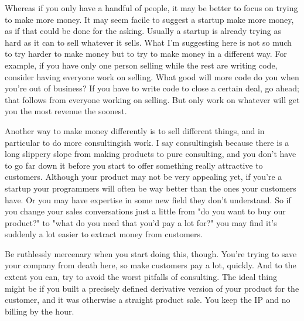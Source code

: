 Whereas
                  if you only have a handful of people, it may be better to
                  focus on trying to make more money. It may seem facile to
                  suggest a startup make more money, as if that could be done
                  for the asking. Usually a startup is already trying as hard as
                  it can to sell whatever it sells. What I'm suggesting here is
                  not so much to try harder to make money but to try to make
                  money in a different way. For example, if you have only one
                  person selling while the rest are writing code, consider
                  having everyone work on selling. What good will more code do
                  you when you're out of business? If you have to write code to
                  close a certain deal, go ahead; that follows from everyone
                  working on selling. But only work on whatever will get you the
                  most revenue the soonest.

Another way to make money
                  differently is to sell different things, and in particular to
                  do more consultingish work. I say consultingish because there
                  is a long slippery slope from making products to pure
                  consulting, and you don't have to go far down it before you
                  start to offer something really attractive to customers.
                  Although your product may not be very appealing yet, if you're
                  a startup your programmers will often be way better than the
                  ones your customers have. Or you may have expertise in some
                  new field they don't understand. So if you change your sales
                  conversations just a little from "do you want to buy our
                  product?" to "what do you need that you'd pay a lot for?" you
                  may find it's suddenly a lot easier to extract money from
                  customers.

Be ruthlessly mercenary when you start
                  doing this, though. You're trying to save your company from
                  death here, so make customers pay a lot, quickly. And to the
                  extent you can, try to avoid the worst pitfalls of consulting.
                  The ideal thing might be if you built a precisely defined
                  derivative version of your product for the customer, and it
                  was otherwise a straight product sale. You keep the IP and no
                  billing by the hour.


